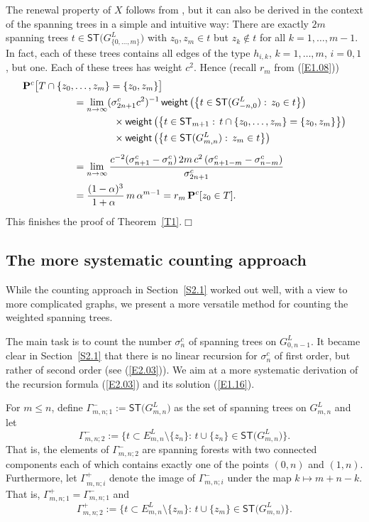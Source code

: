 \documentclass[11pt]{article}
\providecommand{\1}{\mathBB{1}}
\renewcommand{\P}{\mathbf{P}}
\newcommand{\equ}[1]{(\ref{#1})}
\providecommand{\eop}{{}\hfill {}\hfill{$\Box
$}\vspace{0.3cm}\pagebreak[2]\par}
\def\SPT{\mathsf{ST}}
\newcommand{\weight}{\mathop{\mbox{\sf weight}}}
\begin{document}
The renewal property of $X$ follows from \cite[Proposition 2.10]{LyonsSteif2003}, but it can also be derived in the context of the spanning trees in a simple and intuitive way:
There are exactly $2m$ spanning trees $t\in\SPT\big(G^L_{\{0,\ldots,m\}}\big)$ with $z_0,z_m\in t$ but $z_k\not\in t$ for all $k=1,\ldots,m-1$. In fact, each of these trees contains all edges of the type $h_{i,k}$, $k=1,\ldots,m$, $i=0,1$, but one. Each of these trees has weight $c^2$.
Hence (recall $r_m$ from \equ{E1.08})
\begin{equation}
\label{E2.11}
\begin{aligned}
\P^c\big[T\cap\{z_0,&\ldots,z_m\}=\{z_0,z_m\}\big]\\
&=\lim_{n\to\infty}(\sigma^c_{2n+1}c^{2})^{-1}\weight\big(\big\{t\in\SPT(G^L_{-n,0}):\,z_0\in t\big\}\big)\\
&\qquad\qquad\times
\weight\big(\big\{t\in\SPT_{m+1}:\,t\cap\{z_0,\ldots,z_m\}=\{z_0,z_m\}\big\}\big)\\
&\qquad\qquad\times
\weight\big(\big\{t\in\SPT(G^L_{m,n}):\,z_m\in t\big\}\big)\\[2mm]
&=\lim_{n\to\infty}
\frac{c^{-2}(\sigma^c_{n+1}-\sigma^c_{n})\,2m\,c^2\,(\sigma^c_{n+1-m}-\sigma^c_{n-m})}{\sigma^c_{2n+1}}\\
&=\frac{(1-\alpha)^3}{1+\alpha\phantom{)}}\,m\,\alpha^{m-1}=r_m\,\P^c[z_0\in T].
\end{aligned}
\end{equation}
This finishes the proof of Theorem~\ref{T1}.\eop

\subsection{The more systematic counting approach}
\label{S2.2}
While the counting approach in Section~\ref{S2.1} worked out well, with a view to more complicated graphs, we present a more versatile method for counting the weighted spanning trees.

The main task is to count the number $\sigma^c_n$ of spanning trees on $G^L_{0,n-1}$. It became clear in Section~\ref{S2.1} that there is no linear recursion for $\sigma^c_n$ of first order, but rather of second order (see \equ{E2.03}). We aim at a more systematic derivation of the recursion formula \equ{E2.03} and its solution \equ{E1.16}.

For $m\leq n$, define $\Gamma^-_{m,n;1}:=\SPT\big(G^L_{m,n}\big)$ as the set of spanning trees on $G^L_{m,n}$ and let
 $$\Gamma^-_{m,n;2}:=\big\{t\subset E^L_{m,n}\setminus\{z_n\}:\,t\cup\{z_n\}\in\SPT\big(G^L_{m,n}\big)\big\}.$$
That is, the elements of $\Gamma^-_{m,n;2}$ are spanning forests with two connected components each of which contains exactly one of the points $(0,n)$ and $(1,n)$. Furthermore, let $\Gamma^+_{m,n;i}$ denote the image of $\Gamma^-_{m,n;i}$ under the map $k\mapsto m+n-k$. That is, $\Gamma^+_{m,n;1}=\Gamma^-_{m,n;1}$ and
$$\Gamma^+_{m,n;2}:=\big\{t\subset E^L_{m,n}\setminus\{z_m\}:\,t\cup\{z_m\}\in\SPT\big(G^L_{m,n}\big)\big\}.$$
\end{document}

